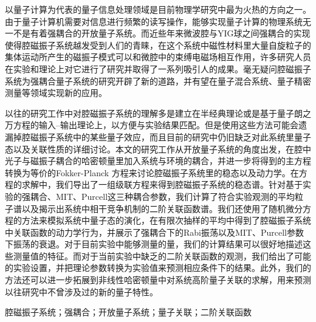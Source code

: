 

\begin{zhaiyao}
以量子计算为代表的量子信息处理领域是目前物理学研究中最为火热的方向之一。由于量子计算机需要对信息进行频繁的读写操作，能够实现量子计算的物理系统无一不是有着强耦合的开放量子系统。而近些年来微波腔与YIG球之间强耦合的实现使得腔磁振子系统越发受到人们的青睐，在这个系统中磁性材料里大量自旋粒子的集体运动所产生的磁振子模式可以和微腔中的束缚电磁场相互作用，许多研究人员在实验和理论上对它进行了研究并取得了一系列吸引人的成果。毫无疑问腔磁振子系统为强耦合量子系统的研究开辟了新的道路，并有望在量子混合系统、量子精密测量等领域实现新的应用。

以往的研究工作中对腔磁振子系统的理解多是建立在半经典理论或是基于量子朗之万方程的输入--输出理论上，以方便与实验结果匹配。但是使用这些方法可能会遗漏掉腔磁振子系统中的某些量子效应，而且目前的研究中仍旧缺乏对此系统里量子态以及关联性质的详细讨论。本文的研究工作从开放量子系统的角度出发，在腔中光子与磁振子耦合的哈密顿量里加入系统与环境的耦合，并进一步将得到的主方程转换为等价的Fokker-Planck 方程来讨论腔磁振子系统里的稳态以及动力学。在方程的求解中，我们导出了一组级联方程来得到腔磁振子系统的稳态谱。针对基于实验的强耦合、MIT、Purcell这三种耦合参数，我们计算了符合实验观测的平均粒子谱以及揭示出系统中相干竞争机制的二阶关联函数谱。我们还使用了随机微分方程的方法来模拟系统中量子态的演化，在有限次抽样的平均中得到了腔磁振子系统中关联函数的动力学行为，并展示了强耦合下的Rabi振荡以及MIT、Purcell参数下振荡的衰退。对于目前实验中能够测量的量，我们的计算结果可以很好地描述这些测量值的特征。而对于当前实验中缺乏的二阶关联函数的观测，我们给出了可能的实验设置，并把理论参数转换为实验值来预测相应条件下的结果。此外，我们的方法还可以进一步拓展到非线性哈密顿量中对系统高阶量子关联的求解，用来预测以往研究中不曾涉及过的新的量子特性。
\end{zhaiyao}




\begin{guanjianci}
腔磁振子系统；强耦合；开放量子系统；量子关联；二阶关联函数
\end{guanjianci}



